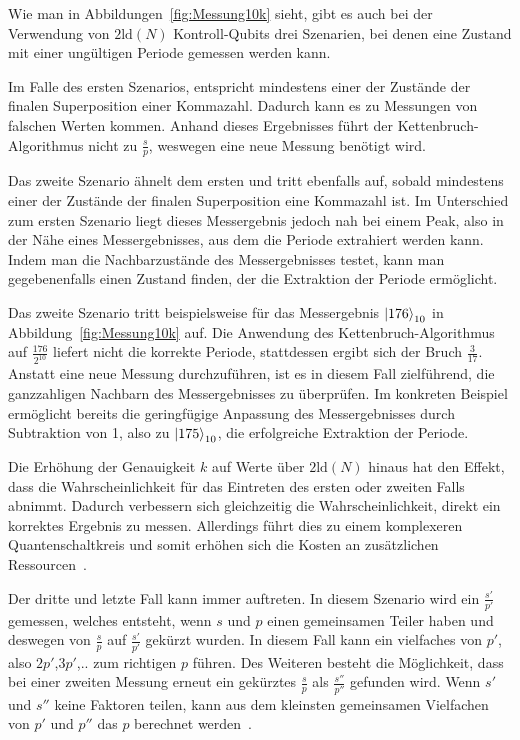 Wie man in Abbildungen~\ref{fig:Messung10k} sieht, 
gibt es auch bei der Verwendung von \(2\text{ld}(N)\) Kontroll-Qubits drei Szenarien, 
bei denen eine Zustand mit einer ungültigen Periode gemessen werden kann.

Im Falle des ersten Szenarios, 
entspricht mindestens einer der Zustände der finalen Superposition einer Kommazahl.
Dadurch kann es zu Messungen von falschen Werten kommen.
Anhand dieses Ergebnisses führt der Kettenbruch-Algorithmus nicht zu \(\frac{s}{p}\), 
weswegen eine neue Messung benötigt wird.

Das zweite Szenario ähnelt dem ersten und tritt ebenfalls auf, 
sobald mindestens einer der Zustände der finalen Superposition eine Kommazahl ist. 
Im Unterschied zum ersten Szenario liegt dieses Messergebnis jedoch nah bei einem Peak, 
also in der Nähe eines Messergebnisses, aus dem die Periode extrahiert werden kann. 
Indem man die Nachbarzustände des Messergebnisses testet, kann man gegebenenfalls einen Zustand finden, 
der die Extraktion der Periode ermöglicht.

Das zweite Szenario tritt beispielsweise für das Messergebnis \(\ket{176}_{10}\) in Abbildung~\ref{fig:Messung10k} auf.
Die Anwendung des Kettenbruch-Algorithmus auf \(\frac{176}{2^{10}}\) 
liefert nicht die korrekte Periode, stattdessen ergibt sich der Bruch \(\frac{3}{17}\). 
Anstatt eine neue Messung durchzuführen,
ist es in diesem Fall zielführend, 
die ganzzahligen Nachbarn des Messergebnisses zu überprüfen.
Im konkreten Beispiel ermöglicht bereits die geringfügige Anpassung des Messergebnisses durch Subtraktion von 1, 
also zu \(\ket{175}_{10}\), 
die erfolgreiche Extraktion der Periode.

Die Erhöhung der Genauigkeit \(k\) auf Werte über \(2\text{ld}(N)\) hinaus hat den Effekt, 
dass die Wahrscheinlichkeit für das Eintreten des ersten oder zweiten Falls abnimmt.
Dadurch verbessern sich gleichzeitig die Wahrscheinlichkeit, direkt ein korrektes Ergebnis zu messen.
Allerdings führt dies zu einem komplexeren Quantenschaltkreis und 
somit erhöhen sich die Kosten an zusätzlichen Ressourcen~\autocite[231]{nielsen_chuang_2010}.

Der dritte und letzte Fall kann immer auftreten.
In diesem Szenario wird ein \(\frac{s'}{p'}\) gemessen, 
welches entsteht, wenn \(s\) und \(p\) einen gemeinsamen Teiler haben und 
deswegen von \(\frac{s}{p}\) auf \(\frac{s'}{p'}\) gekürzt wurden.
In diesem Fall kann ein vielfaches von \(p'\), also \(2p'\),\(3p'\),.. zum richtigen \(p\) führen.
Des Weiteren besteht die Möglichkeit, 
dass bei einer zweiten Messung erneut ein gekürztes \(\frac{s}{p}\) als \(\frac{s''}{p''}\) gefunden wird.
Wenn \(s'\) und \(s''\) keine Faktoren teilen,
kann aus dem kleinsten gemeinsamen Vielfachen von \(p'\) und \(p''\) das \(p\) berechnet werden~\cite{Shor_1997}.

